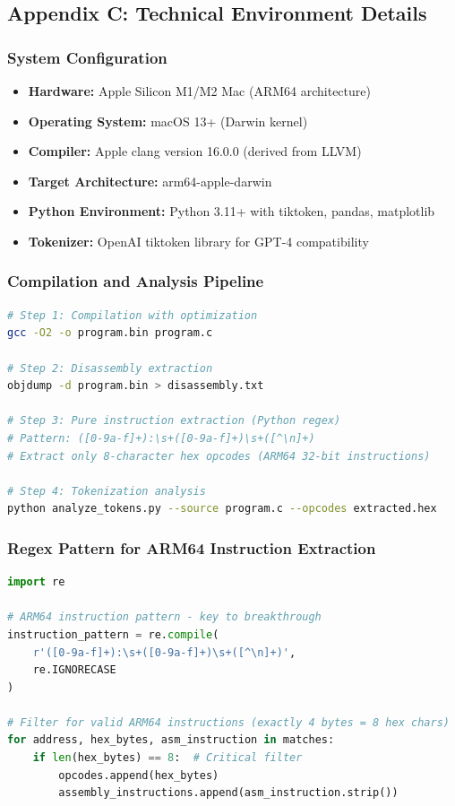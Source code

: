 \documentclass[11pt,a4paper]{article}
\begin{document}
\subsection{Appendix C: Technical Environment Details}

\subsubsection{System Configuration}
\begin{itemize}
    \item \textbf{Hardware:} Apple Silicon M1/M2 Mac (ARM64 architecture)
    \item \textbf{Operating System:} macOS 13+ (Darwin kernel)
    \item \textbf{Compiler:} Apple clang version 16.0.0 (derived from LLVM)
    \item \textbf{Target Architecture:} arm64-apple-darwin
    \item \textbf{Python Environment:} Python 3.11+ with tiktoken, pandas, matplotlib
    \item \textbf{Tokenizer:} OpenAI tiktoken library for GPT-4 compatibility
\end{itemize}

\subsubsection{Compilation and Analysis Pipeline}
\begin{lstlisting}[language=bash, caption=Complete processing pipeline]
# Step 1: Compilation with optimization
gcc -O2 -o program.bin program.c

# Step 2: Disassembly extraction  
objdump -d program.bin > disassembly.txt

# Step 3: Pure instruction extraction (Python regex)
# Pattern: ([0-9a-f]+):\s+([0-9a-f]+)\s+([^\n]+)
# Extract only 8-character hex opcodes (ARM64 32-bit instructions)

# Step 4: Tokenization analysis
python analyze_tokens.py --source program.c --opcodes extracted.hex
\end{lstlisting}

\subsubsection{Regex Pattern for ARM64 Instruction Extraction}
\begin{lstlisting}[language=python, caption=Critical regex pattern for success]
import re

# ARM64 instruction pattern - key to breakthrough
instruction_pattern = re.compile(
    r'([0-9a-f]+):\s+([0-9a-f]+)\s+([^\n]+)', 
    re.IGNORECASE
)

# Filter for valid ARM64 instructions (exactly 4 bytes = 8 hex chars)
for address, hex_bytes, asm_instruction in matches:
    if len(hex_bytes) == 8:  # Critical filter
        opcodes.append(hex_bytes)
        assembly_instructions.append(asm_instruction.strip())
\end{lstlisting}
\end{document}
